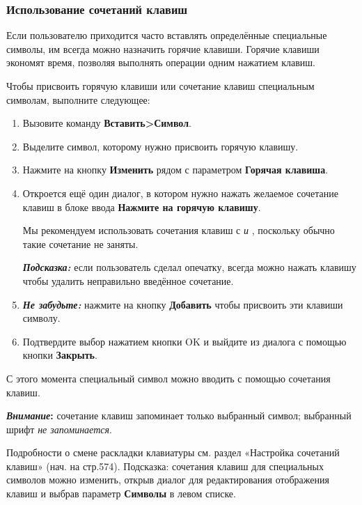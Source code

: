 \documentclass[a4paper,10pt]{article}
\begin{document}
\subsubsection{Использование сочетаний клавиш}
Если пользователю приходится часто вставлять определённые специальные символы, им всегда можно назначить горячие клавиши. Горячие клавиши экономят время, позволяя выполнять операции одним нажатием клавиш.

Чтобы присвоить горячую клавиши или сочетание клавиш специальным символам, выполните следующее:
\begin{enumerate}
 \item Вызовите команду \textbf{Вставить>Символ}.
 \item Выделите символ, которому нужно присвоить горячую клавишу.
 \item Нажмите на кнопку \textbf{Изменить} рядом с параметром \textbf{Горячая клавиша}.
 \item Откроется ещё один диалог, в котором нужно нажать желаемое сочетание клавиш в блоке ввода \textbf{Нажмите на горячую клавишу}.


Мы рекомендуем использовать сочетания клавиш с  \textit{и} , поскольку обычно такие сочетание не заняты.

\textit{\textbf{Подсказка:}} если пользователь сделал опечатку, всегда можно нажать клавишу  чтобы удалить неправильно введённое сочетание.

\item \textit{\textbf{Не забудьте:}} нажмите на кнопку \textbf{Добавить} чтобы присвоить эти клавиши символу.
\item Подтвердите выбор нажатием кнопки OK и выйдите из диалога с помощью кнопки \textbf{Закрыть}.
\end{enumerate}

С этого момента специальный символ можно вводить с помощью сочетания клавиш.

\begin{mdframed}[backgroundcolor=blue!10]
\textbf{\textit{Внимание}:} сочетание клавиш запоминает только выбранный символ; выбранный шрифт \textit{не запоминается}.
\end{mdframed}

Подробности о смене раскладки клавиатуры см. раздел «Настройка сочетаний клавиш» (нач. на стр.574). Подсказка: сочетания клавиш для специальных символов можно изменить, открыв диалог для редактирования отображения клавиш и выбрав параметр \textbf{Символы} в левом списке.
\end{document}
